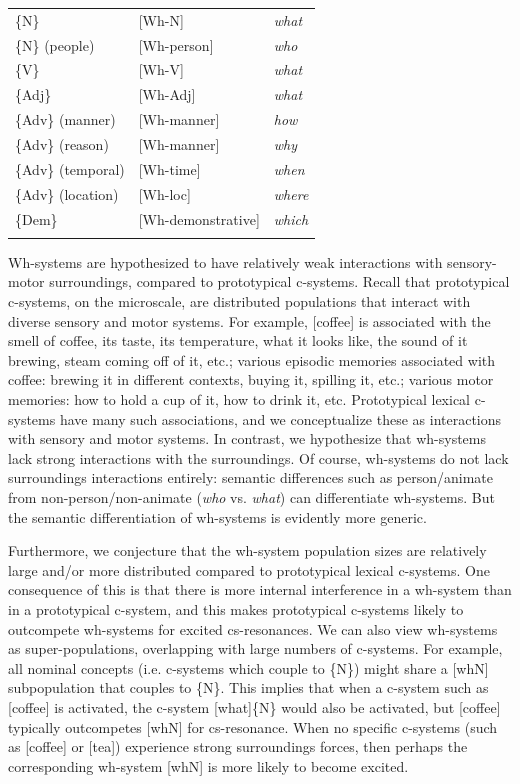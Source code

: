 \begin{tabularx}{\textwidth}{XXX}
\lsptoprule
\{N\} & [Wh-N] & \textit{what}\\
\{N\} (people) & [Wh-person] & \textit{who}\\
\{V\} & [Wh-V] & \textit{what}\\
\{Adj\} & [Wh-Adj] & \textit{what}\\
\{Adv\} (manner) & [Wh-manner] & \textit{how}\\
\{Adv\} (reason) & [Wh-manner] & \textit{why}\\
\{Adv\} (temporal) & [Wh-time] & \textit{when}\\
\{Adv\} (location) & [Wh-loc] & \textit{where}\\
\{Dem\} & [Wh-demonstrative] & \textit{which}\\
\lspbottomrule
\end{tabularx}
  Wh-systems are hypothesized to have relatively weak interactions with sensory-motor surroundings, compared to prototypical c-systems. Recall that prototypical c-systems, on the microscale, are distributed populations that interact with diverse sensory and motor systems. For example, [coffee] is associated with the smell of coffee, its taste, its temperature, what it looks like, the sound of it brewing, steam coming off of it, etc.; various episodic memories associated with coffee: brewing it in different contexts, buying it, spilling it, etc.; various motor memories: how to hold a cup of it, how to drink it, etc. Prototypical lexical c-systems have many such associations, and we conceptualize these as interactions with sensory and motor systems. In contrast, we hypothesize that wh-systems lack strong interactions with the surroundings. Of course, wh-systems do not lack surroundings interactions entirely: semantic differences such as person/animate from non-person/non-animate (\textit{who} vs. \textit{what}) can differentiate wh-systems. But the semantic differentiation of wh-systems is evidently more generic.

  Furthermore, we conjecture that the wh-system population sizes are relatively large and/or more distributed compared to prototypical lexical c-systems. One consequence of this is that there is more internal interference in a wh-system than in a prototypical c-system, and this makes prototypical c-systems likely to outcompete wh-systems for excited cs-resonances. We can also view wh-systems as super-populations, overlapping with large numbers of c-systems. For example, all nominal concepts (i.e. c-systems which couple to \{N\}) might share a [whN] subpopulation that couples to \{N\}. This implies that when a c-system such as [coffee] is activated, the c-system [what]\{N\} would also be activated, but [coffee] typically outcompetes [whN] for cs-resonance. When no specific c-systems (such as [coffee] or [tea]) experience strong surroundings forces, then perhaps the corresponding wh-system [whN] is more likely to become excited.

